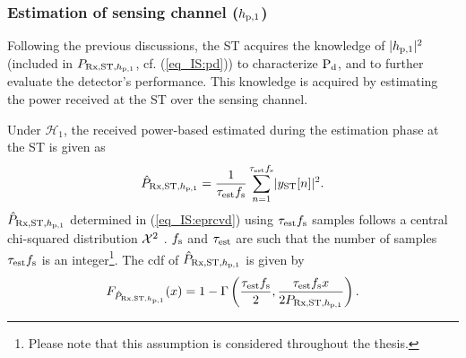\subsubsection{Estimation of sensing channel ($h_{\text{p,1}}$)}
Following the previous discussions, the ST acquires the knowledge of $|h_{\text{p,1}}|^2$ (included in $P_{\text{Rx,ST,$h_{\text{p,1}}$}}$, cf. (\ref{eq_IS:pd})) to characterize $\text{P}_{\text{d}}$, and to further evaluate the detector's performance. This knowledge is acquired by estimating the power received at the ST over the sensing channel. %

Under $\mathcal H_1$, the received power-based estimated during the estimation phase at the ST is given as \cite{Urkowitz} 
\begin{align}
\hat{P}_{\text{Rx,ST,$h_{\text{p,1}}$}} = {\frac{1}{{\tau_{\text{est}} f_{\text{s}}}}\sum_{n=1}^{\tau_{\text{est}} f_{\text{s}}}} { |y_{\text{ST}}[n]|^2}.
\label{eq_IS:eprcvd} 
\end{align}
$\hat{P}_{\text{Rx,ST,$h_{\text{p,1}}$}}$ determined in (\ref{eq_IS:eprcvd}) using $\tau_{\text{est}} f_{\text{s}}$ samples follows a central chi-squared distribution $\cchi2$ \cite{Kay}. $f_{\text{s}}$ and $\tau_{\text{est}}$ are such that the number of samples $\tau_{\text{est}} f_{\text{s}}$ is an integer\footnote{Please note that this assumption is considered throughout the thesis.}. 
The cdf of $\hat{P}_{\text{Rx,ST,$h_{\text{p,1}}$}}$ is given by  
\begin{align}
F_{\hat{P}_{\text{Rx,ST,$h_{\text{p,1}}$}}}(x) = 1 - \Gamma\left(\frac{\tau_{\text{est}} f_{\text{s}}}{2}, \frac{ \tau_{\text{est}} f_{\text{s}} x}{2 P_{\text{Rx,ST,$h_{\text{p,1}}$}}}  \right). 
\label{eq_IS:dprcvd}
\end{align}


